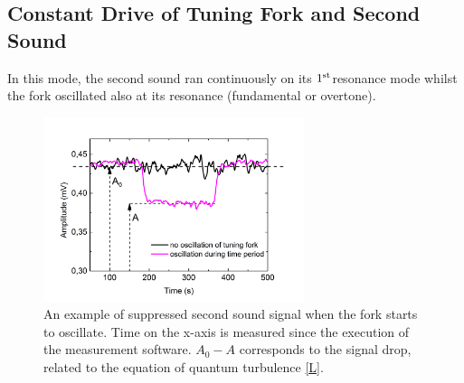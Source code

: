\subsection*{Constant Drive of Tuning Fork and Second Sound}

In this mode, the second sound ran continuously on its $ 1^{\mathrm{st}} $resonance mode whilst the fork oscillated also at its resonance (fundamental or overtone).

\begin{figure}[h]
	\centering
	\vspace{-0.5cm}
	\includegraphics[width=0.68\textwidth]{graphs/example}
	\caption{An example of suppressed second sound signal when the fork starts to oscillate. Time on the x-axis is measured since the execution of the measurement software. $ A_0-A$ corresponds to the signal drop, related to the equation of quantum turbulence \ref{L}.}
\end{figure}